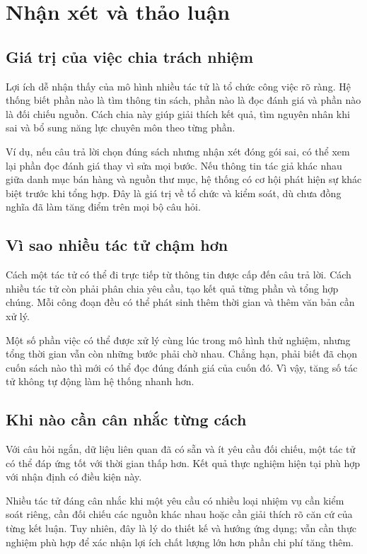 \section{Nhận xét và thảo luận}

\subsection{Giá trị của việc chia trách nhiệm}
Lợi ích dễ nhận thấy của mô hình nhiều tác tử là tổ chức công việc rõ ràng. Hệ thống biết phần nào là tìm thông tin sách, phần nào là đọc đánh giá và phần nào là đối chiếu nguồn. Cách chia này giúp giải thích kết quả, tìm nguyên nhân khi sai và bổ sung năng lực chuyên môn theo từng phần.

Ví dụ, nếu câu trả lời chọn đúng sách nhưng nhận xét đóng gói sai, có thể xem lại phần đọc đánh giá thay vì sửa mọi bước. Nếu thông tin tác giả khác nhau giữa danh mục bán hàng và nguồn thư mục, hệ thống có cơ hội phát hiện sự khác biệt trước khi tổng hợp. Đây là giá trị về tổ chức và kiểm soát, dù chưa đồng nghĩa đã làm tăng điểm trên mọi bộ câu hỏi.

\subsection{Vì sao nhiều tác tử chậm hơn}
Cách một tác tử có thể đi trực tiếp từ thông tin được cấp đến câu trả lời. Cách nhiều tác tử còn phải phân chia yêu cầu, tạo kết quả từng phần và tổng hợp chúng. Mỗi công đoạn đều có thể phát sinh thêm thời gian và thêm văn bản cần xử lý.

Một số phần việc có thể được xử lý cùng lúc trong mô hình thử nghiệm, nhưng tổng thời gian vẫn còn những bước phải chờ nhau. Chẳng hạn, phải biết đã chọn cuốn sách nào thì mới có thể đọc đúng đánh giá của cuốn đó. Vì vậy, tăng số tác tử không tự động làm hệ thống nhanh hơn.

\subsection{Khi nào cần cân nhắc từng cách}
Với câu hỏi ngắn, dữ liệu liên quan đã có sẵn và ít yêu cầu đối chiếu, một tác tử có thể đáp ứng tốt với thời gian thấp hơn. Kết quả thực nghiệm hiện tại phù hợp với nhận định có điều kiện này.

Nhiều tác tử đáng cân nhắc khi một yêu cầu có nhiều loại nhiệm vụ cần kiểm soát riêng, cần đối chiếu các nguồn khác nhau hoặc cần giải thích rõ căn cứ của từng kết luận. Tuy nhiên, đây là lý do thiết kế và hướng ứng dụng; vẫn cần thực nghiệm phù hợp để xác nhận lợi ích chất lượng lớn hơn phần chi phí tăng thêm.

